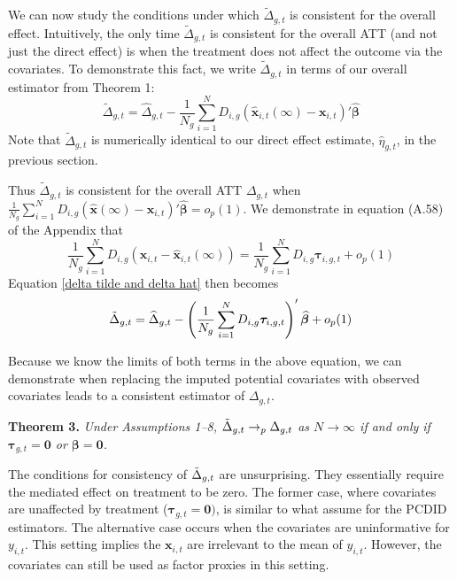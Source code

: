 \documentclass[12pt,fleqn]{article}
\def\*#1{\mathbf{#1}}
\def\+#1{\boldsymbol{#1}}
\begin{document}
We can now study the conditions under which $\tilde{\Delta}_{g,t}$ is consistent for the overall effect. Intuitively, the only time $\tilde{\Delta}_{g,t}$ is consistent for the overall ATT (and not just the direct effect) is when the treatment does not affect the outcome via the covariates. To demonstrate this fact, we write $\tilde{\Delta}_{g,t}$ in terms of our overall estimator from Theorem 1:
\begin{equation}\label{delta tilde and delta hat}
    \tilde{\Delta}_{g,t} = \widehat{\Delta}_{g,t} - \frac{1}{N_g} \sum_{i = 1}^N D_{i,g} (\widehat{\*x}_{i,t}(\infty) - \*x_{i,t})' \widehat{\+\beta}
\end{equation}
Note that $\tilde{\Delta}_{g,t}$ is numerically identical to our direct effect estimate, $\widehat{\eta}_{g,t}$, in the previous section. 

Thus $\tilde{\Delta}_{g,t}$ is consistent for the overall ATT $\Delta_{g,t}$ when $\frac{1}{N_g} \sum_{i = 1}^N D_{i,g} (\widehat{\*x}(\infty) - \*x_{i,t})' \widehat{\+\beta} = o_p(1)$. We demonstrate in equation (A.58) of the Appendix that
\begin{equation}
    \frac{1}{N_g} \sum_{i = 1}^N D_{i,g} (\*x_{i,t} - \widehat{\*x}_{i,t}(\infty)) = \frac{1}{N_g} \sum_{i = 1}^N D_{i,g} \+\tau_{i,g,t} + o_p(1)
\end{equation}
Equation \eqref{delta tilde and delta hat} then becomes
\begin{equation}
    \Tilde{\Delta}_{g,t} = \widehat{\Delta}_{g,t} - \left( \frac{1}{N_g} \sum_{i = 1}^N D_{i,g} \+\tau_{i,g,t} \right)' \widehat{\+\beta} + o_p(1)
\end{equation}

Because we know the limits of both terms in the above equation, we can demonstrate when replacing the imputed potential covariates with observed covariates leads to a consistent estimator of $\Delta_{g,t}$.

\noindent \textbf{Theorem 3.} \emph{Under Assumptions 1--8, $\Tilde{\Delta}_{g,t} \to_p \Delta_{g,t}$ as $N \to \infty$ if and only if $\+\tau_{g,t} = \*0$ or $\+\beta = \*0$.}

\bigskip

The conditions for consistency of $\Tilde{\Delta}_{g,t}$ are unsurprising. They essentially require the mediated effect on treatment to be zero. The former case, where covariates are unaffected by treatment ($\+\tau_{g,t} = \*0)$, is similar to what \citet{chan2022pcdid} assume for the PCDID estimators. The alternative case occurs when the covariates are uninformative for $y_{i,t}$. This setting implies the $\*x_{i,t}$ are irrelevant to the mean of $y_{i,t}$. However, the covariates can still be used as factor proxies in this setting.
\end{document}

